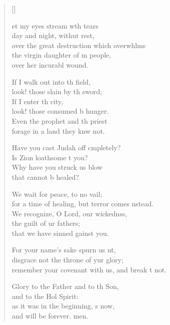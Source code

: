 \settowidth{\versewidth}{remember your covenant with us, and break it not.}
\begin{verse}[\versewidth]
  \begin{patverse}
et my eyes stream w\pointup{\i}th tears\Med\\
day and night, withut rest,\\
over the great destruction which overwhlms\Flex\\
the virgin daughter of m people,\Med\\
over her incurabl wound.

If I walk out into th field,\Med\\
look! those slain by th sword;\\
If I enter th city,\Med\\
look! those consumed b hunger.\\
Even the prophet and th priest\Med\\
forage in a land they knw not.

Have you cast Judah off cmpletely?\Med\\
Is Zion loathsome t you?\\
Why have you struck us  blow\Med\\
that cannot b healed?

We wait for peace, to no vail;\Med\\
for a time of healing, but terror comes \pointup{\i}nstead.\\
We recognize, O Lord, our wickednss,\Flex\\
the guilt of ur fathers;\Med\\
that we have sinned gainst you.

For your name’s sake spurn us nt,\Flex\\
disgrace not the throne of yur glory;\Med\\
remember your covenant with us, and break \pointup{\i}t not.

Glory to the Father and to th Son,\Med\\
and to the Hol Spirit:\\
as it was in the beginning, \pointup{\i}s now,\Med\\
and will be forever. men.
  \end{patverse}
\end{verse}

